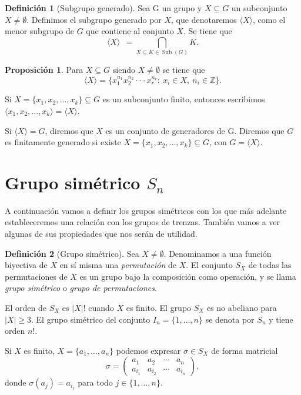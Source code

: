 \documentclass[12pt]{book}
\theoremstyle{definition}
\newtheorem{defi}{Definición}[section]
\newtheorem{prop}{Proposición}[section]
\begin{document}
\begin{defi}[Subgrupo generado]
Sea G un grupo y $X\subseteq G$ un subconjunto $X\neq\emptyset$. Definimos el subgrupo generado por $X$, que denotaremos $\langle X\rangle$, como el menor subgrupo de $G$ que contiene al conjunto $X$. Se tiene que
$$\langle X\rangle\ \ =\bigcap_{X\subseteq K\in \operatorname{Sub}(G)}K.$$

\end{defi}

\begin{prop}
Para $X\subseteq G$ siendo $X\neq\emptyset$ se tiene que
$$\langle X\rangle = \{x_1^{n_1}x_2^{n_2}\cdot\cdot\cdot x_r^{n_r} :\ x_i\in X,\ n_i\in\mathbb{Z}\}.$$

\end{prop}



Si $X=\{x_1,x_2,...,x_k\}\subseteq G$ es un subconjunto finito, entonces escribimos $\langle x_1,x_2,...,x_k\rangle=\langle X\rangle$.

Si $\langle X\rangle = G$, diremos que $X$ es un conjunto de generadores de G. Diremos que $G$ es finitamente generado si existe $X=\{x_1,x_2,...,x_k\}\subseteq G$, con $G=\langle X\rangle$. 
\newline


\section{Grupo simétrico $S_n$}

A continuación vamos a definir los grupos simétricos con los que más adelante estableceremos una relación con los grupos de trenzas. También vamos a ver algunas de sus propiedades que nos serán de utilidad.

\begin{defi}[Grupo simétrico]
Sea $X \neq \emptyset$. Denominamos a una función biyectiva de $X$ en sí misma una \textit{permutación} de $X$. El conjunto $S_X$ de todas las permutaciones de $X$ es un grupo bajo la composición como operación, y se llama \textit{grupo simétrico} o \textit{grupo de permutaciones}.
\end{defi}

El orden de $S_X$ es $|X|!$ cuando $X$ es finito. El grupo $S_X$ es no abeliano para $|X|\geq 3$. El grupo simétrico del conjunto $I_n=\{1,\ldots,n\}$ se denota por $S_n$ y tiene orden $n!$.

Si $X$ es finito, $X = \{a_1,\ldots,a_n\}$ podemos expresar $\sigma\in S_X$ de forma matricial
$$\sigma = 
\begin{pmatrix}
a_1 & a_2 & \cdots & a_n\\
a_{i_1} & a_{i_2} & \cdots & a_{i_n}
\end{pmatrix}
,$$
donde $\sigma(a_j)=a_{i_j}$ para todo $j\in\{1,\ldots,n\}$.
\end{document}
